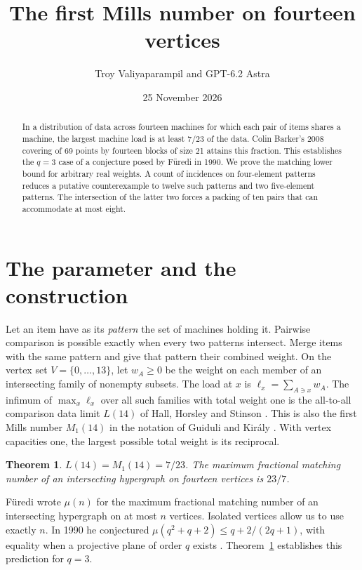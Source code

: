 \documentclass[11pt]{article}
\title{The first Mills number on fourteen vertices}
\author{Troy Valiyaparampil and GPT-6.2 Astra}
\date{25 November 2026}
\newtheorem{theorem}{Theorem}
\begin{document}
\maketitle
\begin{abstract}
In a distribution of data across fourteen machines for which each pair of
items shares a machine, the largest machine load is at least \(7/23\) of
the data. Colin Barker's 2008 covering of 69 points by fourteen blocks of
size 21 attains this fraction. This establishes the \(q=3\) case of
a conjecture posed by F\"uredi in 1990. We prove the matching lower bound for
arbitrary real weights. A count of incidences on four-element patterns
reduces a putative counterexample to twelve such patterns and two
five-element patterns. The intersection of the latter two forces a
packing of ten pairs that can accommodate at most eight.
\end{abstract}

\section{The parameter and the construction}
Let an item have as its \emph{pattern} the set of machines holding it.
Pairwise comparison is possible exactly when every two patterns intersect.
Merge items with the same pattern and give that pattern their combined
weight. On the vertex set \(V=\{0,\ldots,13\}\), let \(w_A\ge0\)
be the weight on each member of an intersecting family of nonempty
subsets. The load at \(x\) is \(\ell_x=\sum_{A\ni x}w_A\).
The infimum of \(\max_x\ell_x\) over all such families with total weight
one is the all-to-all comparison data limit \(L(14)\) of Hall, Horsley and
Stinson \cite{hhs}. This is also the first Mills number \(M_1(14)\) in the
notation of Guiduli and Kir\'aly \cite{gk}. With vertex capacities one,
the largest possible total weight is its reciprocal.

\begin{theorem}\label{thm:main}
\(L(14)=M_1(14)=7/23\). The maximum fractional matching number of
an intersecting hypergraph on fourteen vertices is \(23/7\).
\end{theorem}

F\"uredi \cite[Conjecture 4.9]{furedi94} wrote \(\mu(n)\) for the
maximum fractional matching number of an intersecting hypergraph on at
most \(n\) vertices. Isolated vertices allow us to use exactly \(n\).
In 1990 he conjectured \(\mu(q^2+q+2)\le q+2/(2q+1)\), with equality
when a projective plane of order \(q\) exists \cite[Conjecture (6.3)]{furedi90}.
Theorem~\ref{thm:main} establishes this prediction for \(q=3\).
\end{document}
